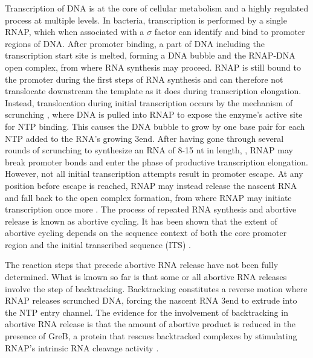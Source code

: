 %
Transcription of DNA is at the core of cellular metabolism and a highly
regulated process at multiple levels. In bacteria, transcription is performed
by a single RNAP, which when associated with a $\sigma$ factor can identify
and bind to promoter regions of DNA. After promoter binding, a part of DNA
including the transcription start site is melted, forming a DNA bubble and the
RNAP-DNA open complex, from where RNA synthesis may proceed. RNAP is still
bound to the promoter during the first steps of RNA synthesis and can
therefore not translocate downstream the template as it does during
transcription elongation. Instead, translocation during initial transcription
occurs by the mechanism of scrunching \cite{revyakin_abortive_2006,
kapanidis_initial_2006}, where DNA is pulled into RNAP to expose the enzyme's
active site for NTP binding. This causes the DNA bubble to grow by one base
pair for each NTP added to the RNA's growing 3\ppp end. After having
gone through several rounds of scrunching to synthesize an RNA of 8-15 nt in
length,
\cite{carpousis_cycling_1980,hsu_vitro_2003,tang_real-time_2009,hsu_initial_2006},
RNAP may break promoter bonds and enter the phase of productive transcription
elongation. However, not all initial transcription attempts result in promoter
escape. At any position before escape is reached, RNAP may instead release the
nascent RNA and fall back to the open complex formation, from where RNAP may
initiate transcription once more \cite{carpousis_cycling_1980}. The process of
repeated RNA synthesis and abortive release is known as abortive cycling. It
has been shown that the extent of abortive cycling depends on the sequence
context of both the core promoter region and the initial transcribed
sequence (ITS) \cite{hsu_initial_2006, hsu_promoter_2002, vo_vitro_2003}.

The reaction steps that precede abortive RNA release have not been fully
determined. What is known so far is that some or all abortive RNA releases
involve the step of backtracking. Backtracking constitutes a reverse motion
where RNAP releases scrunched DNA, forcing the nascent RNA 3\ppp end to
extrude into the NTP entry channel. The evidence for the involvement of
backtracking in abortive RNA release is that the amount of abortive product is
reduced in the presence of GreB, a protein that rescues backtracked complexes
by stimulating RNAP's intrinsic RNA cleavage activity
\cite{hsu_initial_2006,hsu_escherichia_1995,feng_grea-induced_1994}.


